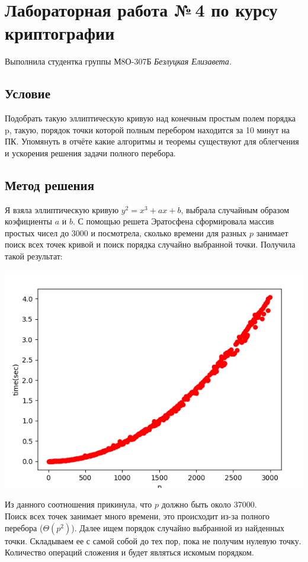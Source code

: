 \documentclass[12pt]{article}
\begin{document}
\section*{Лабораторная работа №\,4 по курсу криптографии}

Выполнила студентка группы М8О-307Б \textit{Безлуцкая Елизавета}.

\subsection*{Условие}
Подобрать такую эллиптическую кривую над конечным простым полем порядка p, такую,
порядок точки которой полным перебором находится за 10 минут на ПК. Упомянуть в отчёте
какие алгоритмы и теоремы существуют для облегчения и ускорения решения задачи полного
перебора.

\subsection*{Метод решения}

Я взяла эллиптическую кривую $y^2 = x^3 + ax + b$, выбрала случайным образом коэфициенты $a$ и $b$. С помощью решета Эратосфена сформировала массив простых чисел до 3000 и посмотрела, сколько времени для разных $p$ занимает поиск всех точек кривой и поиск порядка случайно выбранной точки. Получила такой результат:

\includegraphics[scale=0.5]{images/ptime.png}

Из данного соотношения прикинула, что $p$ должно быть около 37000.\\

Поиск всех точек занимает много времени, это происходит из-за полного перебора ($\Theta(p^2)$). Далее ищем порядок случайно выбранной из найденных точки. Складываем ее с самой собой до тех пор, пока не получим нулевую точку. Количество операций сложения и будет являться искомым порядком.\\
\end{document}
